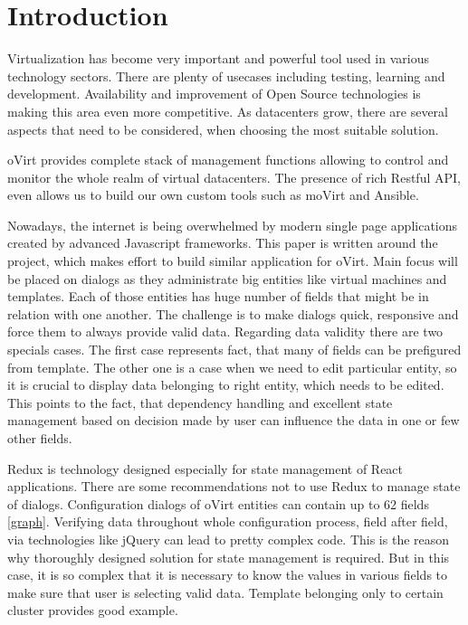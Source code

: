 
\chapter{Introduction}
Virtualization has become very important and powerful tool used in various technology sectors. There are plenty of usecases including testing, learning and development. Availability and improvement of Open Source technologies is making this area even more competitive. As datacenters grow, there are several aspects that need to be considered, when choosing the most suitable solution.

oVirt\cite{oVirt} provides complete stack of management functions allowing to control and monitor the whole realm of virtual datacenters. The presence of rich Restful API, even allows us to build our own custom tools such as moVirt\cite{moVirt} and Ansible\cite{Ansible}. 

Nowadays, the internet is being overwhelmed by modern single page applications created by advanced Javascript frameworks. This paper is written around the project, which makes effort to build similar application for oVirt. Main focus will be placed on dialogs as they administrate big entities like virtual machines and templates. Each of those entities has huge number of fields that might be in relation with one another. The challenge is to make dialogs quick, responsive and force them to always provide valid data. Regarding data validity there are two specials cases. The first case represents fact, that many of fields can be prefigured from template. The other one is a case when we need to edit particular entity, so it is crucial to display data belonging to right entity, which needs to be edited. This points to the fact, that dependency handling and excellent state management based on decision made by user can influence the data in one or few other fields.

Redux is technology designed especially for state management of React\cite{React} applications. There are some recommendations not to use Redux\cite{Redux} to manage state of dialogs. Configuration dialogs of oVirt entities can contain up to 62 fields \ref{graph}. Verifying data throughout whole configuration process, field after field, via technologies like jQuery can lead to pretty complex code. This is the reason why thoroughly designed solution for state management is required. But in this case, it is so complex that it is necessary to know the values in various fields to make sure that user is selecting valid data. Template belonging only to certain cluster provides good example.

